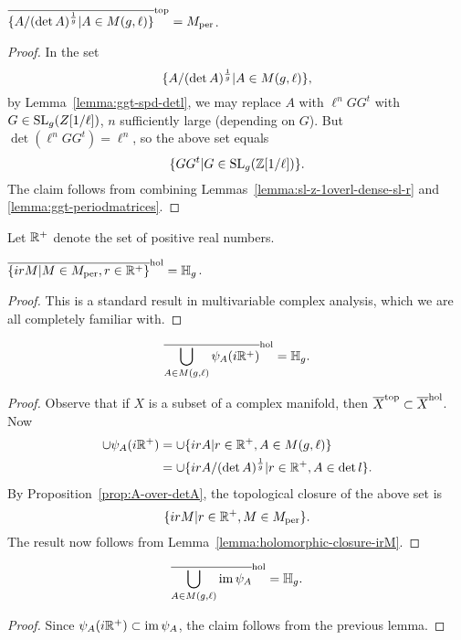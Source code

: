 \documentclass{amsart}
\begin{document}
\begin{proposition}\label{prop:A-over-detA}
  $\overline{\{A/(\det A)^{\frac{1}{g}} | A \in M(g,\ell)\}}^\mathrm{top} = M_{\textrm{per}}$.
\end{proposition}

\begin{proof}
  In the set
  \[
    \{A/(\det A)^{\frac{1}{g}} | A \in M(g,\ell)\},
  \]
  by Lemma~\ref{lemma:ggt-spd-detl}, we may replace $A$ with $\ell^n GG^t$ with $G \in \operatorname{SL}_g(Z[1/\ell])$, $n$ sufficiently large (depending on $G$). But $\det (\ell^n GG^t) = \ell^n$, so the above set equals
  \[
    \{GG^t | G \in \operatorname{SL}_g(\mathbb{Z}[1/\ell])\}.
  \]
  The claim follows from combining Lemmas~\ref{lemma:sl-z-1overl-dense-sl-r} and \ref{lemma:ggt-periodmatrices}.
\end{proof}

Let $\mathbb{R}^+$ denote the set of positive real numbers.
\begin{lemma}\label{lemma:holomorphic-closure-irM}
  $\overline{\{ irM | M \in M_{\textrm{per}}, r \in \mathbb{R}^+\}}^\mathrm{hol} = \mathbb{H}_g$.
\end{lemma}

\begin{proof}
  This is a standard result in multivariable complex analysis, which we are all completely familiar with.
\end{proof}

\begin{lemma}
  \[
    \overline{\bigcup_{A \in M(g,\ell)} \psi_A(i\mathbb{R}^+)}^\mathrm{hol} = \mathbb{H}_g.
  \]
\end{lemma}

\begin{proof}
  Observe that if $X$ is a subset of a complex manifold, then $\overline{X}^\mathrm{top} \subset \overline{X}^\mathrm{hol}$. Now
  \begin{align*}
    \cup \psi_A(i\mathbb{R}^+) &= \cup \{irA | r \in \mathbb{R}^+, A \in M(g,\ell)\} \\
               &= \cup \{irA/(\det A)^{\frac{1}{g}} | r \in \mathbb{R}^+, A \in \det l\}.
  \end{align*}
  By Proposition~\ref{prop:A-over-detA}, the topological closure of the above set is
  \[
    \{irM | r \in \mathbb{R}^+, M \in M_{\textrm{per}}\}.
  \]
  The result now follows from Lemma~\ref{lemma:holomorphic-closure-irM}.
\end{proof}

\begin{lemma}
  \[
    \overline{\bigcup_{A \in M(g,\ell)} \operatorname{im} \psi_A}^\mathrm{hol} = \mathbb{H}_g.
  \]
\end{lemma}

\begin{proof}
  Since $\psi_A(i\mathbb{R}^+) \subset \operatorname{im} \psi_A$, the claim follows from the previous lemma.
\end{proof}
\end{document}

